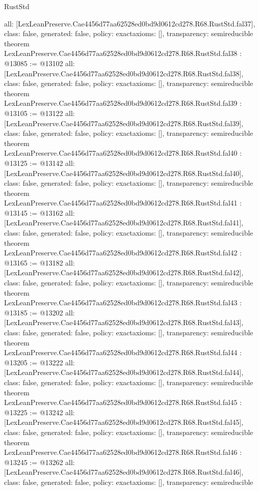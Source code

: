 \begin{lexlean}{RustStd}
\begin{coremodule}
{  all: [LexLeanPreserve.Cae4456d77aa62528ed0bd9d0612cd278.R68.RustStd.fal37],
  class: false,
  generated: false,
  policy: exact{axioms: []},
  transparency: semireducible
}
theorem LexLeanPreserve.Cae4456d77aa62528ed0bd9d0612cd278.R68.RustStd.fal38 : @13085 := @13102 {
  all: [LexLeanPreserve.Cae4456d77aa62528ed0bd9d0612cd278.R68.RustStd.fal38],
  class: false,
  generated: false,
  policy: exact{axioms: []},
  transparency: semireducible
}
theorem LexLeanPreserve.Cae4456d77aa62528ed0bd9d0612cd278.R68.RustStd.fal39 : @13105 := @13122 {
  all: [LexLeanPreserve.Cae4456d77aa62528ed0bd9d0612cd278.R68.RustStd.fal39],
  class: false,
  generated: false,
  policy: exact{axioms: []},
  transparency: semireducible
}
theorem LexLeanPreserve.Cae4456d77aa62528ed0bd9d0612cd278.R68.RustStd.fal40 : @13125 := @13142 {
  all: [LexLeanPreserve.Cae4456d77aa62528ed0bd9d0612cd278.R68.RustStd.fal40],
  class: false,
  generated: false,
  policy: exact{axioms: []},
  transparency: semireducible
}
theorem LexLeanPreserve.Cae4456d77aa62528ed0bd9d0612cd278.R68.RustStd.fal41 : @13145 := @13162 {
  all: [LexLeanPreserve.Cae4456d77aa62528ed0bd9d0612cd278.R68.RustStd.fal41],
  class: false,
  generated: false,
  policy: exact{axioms: []},
  transparency: semireducible
}
theorem LexLeanPreserve.Cae4456d77aa62528ed0bd9d0612cd278.R68.RustStd.fal42 : @13165 := @13182 {
  all: [LexLeanPreserve.Cae4456d77aa62528ed0bd9d0612cd278.R68.RustStd.fal42],
  class: false,
  generated: false,
  policy: exact{axioms: []},
  transparency: semireducible
}
theorem LexLeanPreserve.Cae4456d77aa62528ed0bd9d0612cd278.R68.RustStd.fal43 : @13185 := @13202 {
  all: [LexLeanPreserve.Cae4456d77aa62528ed0bd9d0612cd278.R68.RustStd.fal43],
  class: false,
  generated: false,
  policy: exact{axioms: []},
  transparency: semireducible
}
theorem LexLeanPreserve.Cae4456d77aa62528ed0bd9d0612cd278.R68.RustStd.fal44 : @13205 := @13222 {
  all: [LexLeanPreserve.Cae4456d77aa62528ed0bd9d0612cd278.R68.RustStd.fal44],
  class: false,
  generated: false,
  policy: exact{axioms: []},
  transparency: semireducible
}
theorem LexLeanPreserve.Cae4456d77aa62528ed0bd9d0612cd278.R68.RustStd.fal45 : @13225 := @13242 {
  all: [LexLeanPreserve.Cae4456d77aa62528ed0bd9d0612cd278.R68.RustStd.fal45],
  class: false,
  generated: false,
  policy: exact{axioms: []},
  transparency: semireducible
}
theorem LexLeanPreserve.Cae4456d77aa62528ed0bd9d0612cd278.R68.RustStd.fal46 : @13245 := @13262 {
  all: [LexLeanPreserve.Cae4456d77aa62528ed0bd9d0612cd278.R68.RustStd.fal46],
  class: false,
  generated: false,
  policy: exact{axioms: []},
  transparency: semireducible
}
\end{coremodule}
\end{lexlean}
